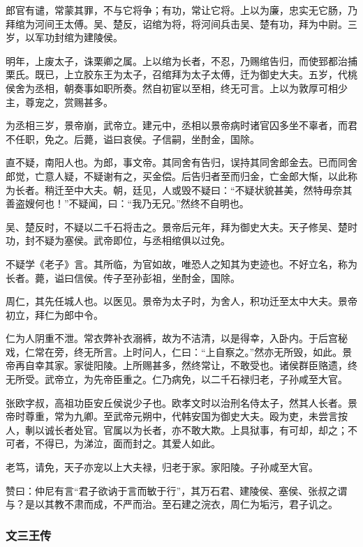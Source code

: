\documentclass[]{article}
\begin{document}
郎官有谴，常蒙其罪，不与它将争；有功，常让它将。上以为廉，忠实无它肠，乃拜绾为河间王太傅。吴、楚反，诏绾为将，将河间兵击吴、楚有功，拜为中尉。三岁，以军功封绾为建陵侯。

明年，上废太子，诛栗卿之属。上以绾为长者，不忍，乃赐绾告归，而使郅都治捕栗氏。既已，上立胶东王为太子，召绾拜为太子太傅，迁为御史大夫。五岁，代桃侯舍为丞相，朝奏事如职所奏。然自初宦以至相，终无可言。上以为敦厚可相少主，尊宠之，赏赐甚多。

为丞相三岁，景帝崩，武帝立。建元中，丞相以景帝病时诸官囚多坐不辜者，而君不任职，免之。后薨，谥曰哀侯。子信嗣，坐酎金，国除。

直不疑，南阳人也。为郎，事文帝。其同舍有告归，误持其同舍郎金去。已而同舍郎觉，亡意人疑，不疑谢有之，买金偿。后告归者至而归金，亡金郎大惭，以此称为长者。稍迁至中大夫。朝，廷见，人或毁不疑曰：``不疑状貌甚美，然特毋奈其善盗嫂何也！''不疑闻，曰：``我乃无兄。''然终不自明也。

吴、楚反时，不疑以二千石将击之。景帝后元年，拜为御史大夫。天子修吴、楚时功，封不疑为塞侯。武帝即位，与丞相绾俱以过免。

不疑学《老子》言。其所临，为官如故，唯恐人之知其为吏迹也。不好立名，称为长者。薨，谥曰信侯。传子至孙彭祖，坐酎金，国除。

周仁，其先任城人也。以医见。景帝为太子时，为舍人，积功迁至太中大夫。景帝初立，拜仁为郎中令。

仁为人阴重不泄。常衣弊补衣溺裤，故为不洁清，以是得幸，入卧内。于后宫秘戏，仁常在旁，终无所言。上时问人，仁曰：``上自察之。''然亦无所毁，如此。景帝再自幸其家。家徙阳陵。上所赐甚多，然终常让，不敢受也。诸侯群臣赂遗，终无所受。武帝立，为先帝臣重之。仁乃病免，以二千石禄归老，子孙咸至大官。

张欧字叔，高祖功臣安丘侯说少子也。欧孝文时以治刑名侍太子，然其人长者。景帝时尊重，常为九卿。至武帝元朔中，代韩安国为御史大夫。殴为吏，未尝言按人，剸以诚长者处官。官属以为长者，亦不敢大欺。上具狱事，有可却，却之；不可者，不得已，为涕泣，面而封之。其爱人如此。

老笃，请免，天子亦宠以上大夫禄，归老于家。家阳陵。子孙咸至大官。

赞曰：仲尼有言``君子欲讷于言而敏于行''，其万石君、建陵侯、塞侯、张叔之谓与？是以其教不肃而成，不严而治。至石建之浣衣，周仁为垢污，君子讥之。

\hypertarget{header-n4059}{%
\subsubsection{文三王传}\label{header-n4059}}
\end{document}
